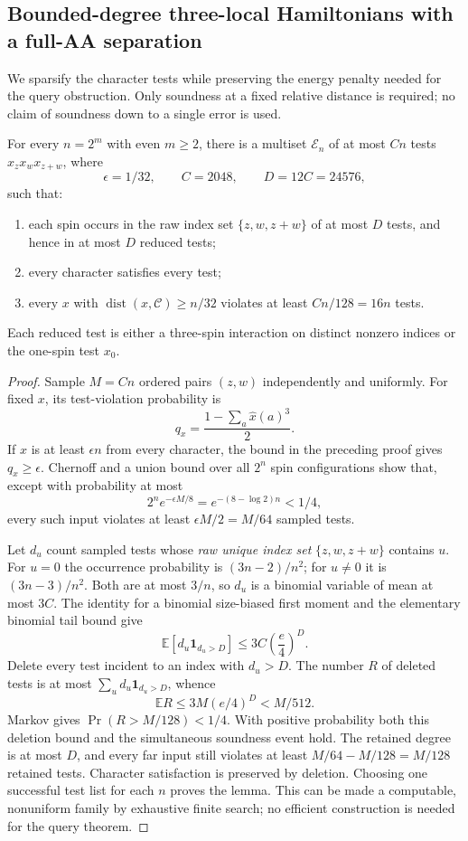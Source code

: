 \subsection{Bounded-degree three-local Hamiltonians with a full-AA separation}
\label{res:sparse}

We sparsify the character tests while preserving the energy penalty
needed for the query obstruction.  Only soundness at a fixed relative
distance is required; no claim of soundness down to a single error is
used.

\begin{lemma}
\label{res:sparse-lemma}
For every $n=2^m$ with even $m\ge2$, there is a multiset $\mathcal E_n$
of at most $Cn$ tests $x_zx_wx_{z+w}$, where
\[
 \epsilon=1/32,\qquad C=2048,\qquad D=12C=24576,
\]
such that:
\begin{enumerate}
\item each spin occurs in the raw index set $\{z,w,z+w\}$ of at most
      $D$ tests, and hence in at most $D$ reduced tests;
\item every character satisfies every test;
\item every $x$ with $\operatorname{dist}(x,\mathcal C)\ge n/32$
      violates at least $Cn/128=16n$ tests.
\end{enumerate}
Each reduced test is either a three-spin interaction on distinct
nonzero indices or the one-spin test $x_0$.
\end{lemma}

\begin{proof}
Sample $M=Cn$ ordered pairs $(z,w)$ independently and uniformly.
For fixed $x$, its test-violation probability is
\[
 q_x=\frac{1-\sum_a\widehat x(a)^3}{2}.
\]
If $x$ is at least $\epsilon n$ from every character, the bound in the
preceding proof gives $q_x\ge\epsilon$.  Chernoff and a union bound
over all $2^n$ spin configurations show that, except with probability
at most
\[
 2^ne^{-\epsilon M/8}=e^{-(8-\log2)n}<1/4,
\]
every such input violates at least $\epsilon M/2=M/64$ sampled tests.

Let $d_u$ count sampled tests whose \emph{raw unique index set}
$\{z,w,z+w\}$ contains $u$.  For $u=0$ the occurrence probability is
$(3n-2)/n^2$; for $u\ne0$ it is $(3n-3)/n^2$.  Both are at most
$3/n$, so $d_u$ is a
binomial variable of mean at most $3C$.  The identity for a binomial
size-biased first moment and the elementary binomial tail bound give
\[
 \mathbb E[d_u\mathbf1_{d_u>D}]
 \le3C\left(\frac e4\right)^D.
\]
Delete every test incident to an index with $d_u>D$.  The number $R$
of deleted tests is at most $\sum_ud_u\mathbf1_{d_u>D}$, whence
\[
 \mathbb ER\le3M(e/4)^D<M/512.
\]
Markov gives $\Pr(R>M/128)<1/4$.  With positive probability both this
deletion bound and the simultaneous soundness event hold.  The
retained degree is at most $D$, and every far input still violates at
least $M/64-M/128=M/128$ retained tests.  Character satisfaction is
preserved by deletion.  Choosing one successful test list for each
$n$ proves the lemma.  This can be made a computable, nonuniform
family by exhaustive finite search; no efficient construction is
needed for the query theorem.
\end{proof}

